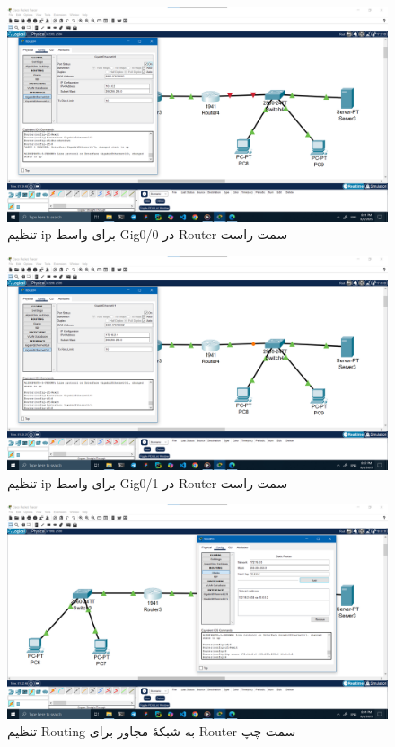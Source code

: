 \documentclass[12pt]{article}
\begin{document}
	\begin{figure}[H]
		\centering
		\includegraphics[width=\textwidth]{resources/scenario2-4.png}
		\caption{تنظیم \textenglish{ip} برای واسط \textenglish{Gig0/0} در \textenglish{Router} سمت راست}
		\label{2:4}
	\end{figure}
	\begin{figure}[H]
		\centering
		\includegraphics[width=\textwidth]{resources/scenario2-5.png}
		\caption{تنظیم \textenglish{ip} برای واسط \textenglish{Gig0/1} در \textenglish{Router} سمت راست}
		\label{2:5}
	\end{figure}
	\begin{figure}[H]
		\centering
		\includegraphics[width=\textwidth]{resources/scenario2-6.png}
		\caption{تنظیم \textenglish{Routing} به شبکهٔ مجاور برای \textenglish{Router} سمت چپ}
		\label{2:6}
	\end{figure}
\end{document}
